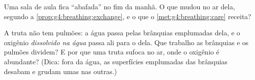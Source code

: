\begin{exercise}[$\star\star$]\label{exo:g4:breathing:10}
Uma sala de aula fica ``abafada'' no fim da manhã. O que mudou no ar
dela, segundo a \cref{prop:g4:breathing:exchange}, e o que o
\cref{met:g4:breathing:care} receita?
\end{exercise}

\begin{exercise}[$\star\star\star$]\label{exo:g4:breathing:11}
A truta não tem pulmões: a água passa pelas brânquias emplumadas
dela, e o oxigênio \emph{dissolvido na água} passa ali para o 
dela. Que trabalho as brânquias e os pulmões dividem? E por que uma
truta sufoca no ar, onde o oxigênio é abundante? (Dica: fora da
água, as superfícies emplumadas das brânquias desabam e grudam umas
nas outras.)
\end{exercise}
